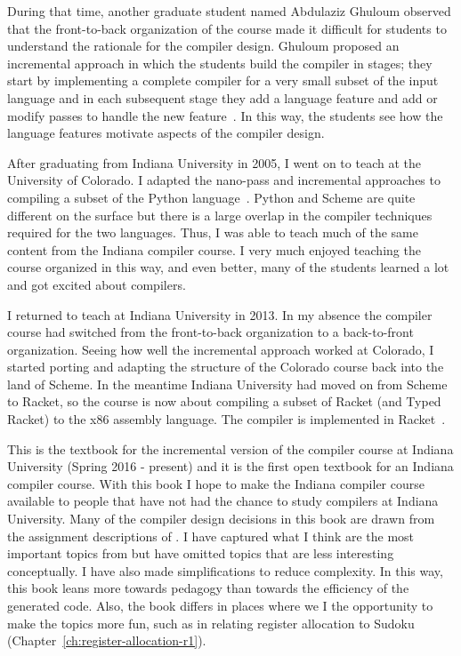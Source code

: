 \documentclass[11pt]{book}
\begin{document}
During that time, another graduate student named Abdulaziz Ghuloum
observed that the front-to-back organization of the course made it
difficult for students to understand the rationale for the compiler
design. Ghuloum proposed an incremental approach in which the students
build the compiler in stages; they start by implementing a complete
compiler for a very small subset of the input language and in each
subsequent stage they add a language feature and add or modify passes
to handle the new feature~\citep{Ghuloum:2006bh}.  In this way, the
students see how the language features motivate aspects of the
compiler design.

After graduating from Indiana University in 2005, I went on to teach
at the University of Colorado. I adapted the nano-pass and incremental
approaches to compiling a subset of the Python
language~\citep{Siek:2012ab}.  Python and Scheme are quite different
on the surface but there is a large overlap in the compiler techniques
required for the two languages. Thus, I was able to teach much of the
same content from the Indiana compiler course. I very much enjoyed
teaching the course organized in this way, and even better, many of
the students learned a lot and got excited about compilers.

I returned to teach at Indiana University in 2013.  In my absence the
compiler course had switched from the front-to-back organization to a
back-to-front organization. Seeing how well the incremental approach
worked at Colorado, I started porting and adapting the structure of
the Colorado course back into the land of Scheme. In the meantime
Indiana University had moved on from Scheme to Racket, so the course
is now about compiling a subset of Racket (and Typed Racket) to the
x86 assembly language. The compiler is implemented in
Racket~\citep{plt-tr}.

This is the textbook for the incremental version of the compiler
course at Indiana University (Spring 2016 - present) and it is the
first open textbook for an Indiana compiler course.  With this book I
hope to make the Indiana compiler course available to people that have
not had the chance to study compilers at Indiana University.  Many of
the compiler design decisions in this book are drawn from the
assignment descriptions of \cite{Dybvig:2010aa}. I have captured what
I think are the most important topics from \cite{Dybvig:2010aa} but
have omitted topics that are less interesting conceptually. I have
also made simplifications to reduce complexity.  In this way, this
book leans more towards pedagogy than towards the efficiency of the
generated code. Also, the book differs in places where we I the
opportunity to make the topics more fun, such as in relating register
allocation to Sudoku (Chapter~\ref{ch:register-allocation-r1}).
\end{document}
